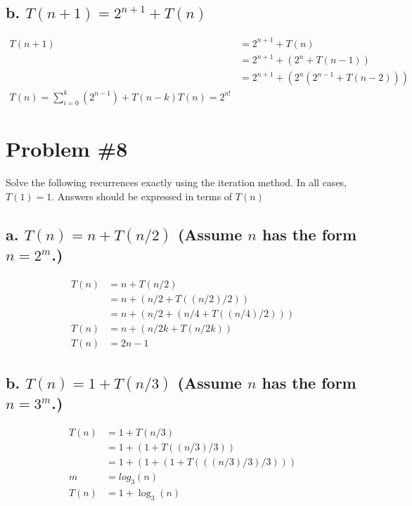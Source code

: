 \documentclass{article}
\begin{document}
\subsection*{b. \(T(n + 1) = 2^{n + 1} + T(n)\)}
\begin{subequations}
  \begin{align}
    T(n + 1) &= 2^{n + 1} + T(n) \\
    &= 2^{n + 1} + (2^{n} + T(n - 1)) \\
    &= 2^{n + 1} + (2^{n} (2^{n - 1} + T(n - 2))) \\
    T(n) = \sum_{i=0}^{k}(2^{n - 1}) + T(n - k)
    T(n) = 2^{n!}
  \end{align}
\end{subequations}

\section*{Problem \#8}
Solve the following recurrences exactly using the iteration method. In all cases, \(T(1) = 1\).
Answers should be expressed in terms of \(T(n)\)

\subsection*{a. \(T(n) = n + T(n/2)\) (Assume \(n\) has the form \(n = 2^m\).)}
\begin{subequations}
  \begin{align}
    T(n) &= n + T(n/2) \\
    &= n + (n/2 + T((n/2)/2)) \\
    &= n + (n/2 + (n/4 + T((n/4)/2))) \\
    T(n) &= n + (n/2k + T(n/2k)) \\
    T(n) &= 2n - 1
  \end{align}
\end{subequations}

\subsection*{b. \(T(n) = 1 + T(n/3)\) (Assume \(n\) has the form \(n = 3^m\).)}
\begin{subequations}
  \begin{align}
    T(n) &= 1 + T(n/3) \\
    &= 1 + (1 + T((n/3)/3)) \\
    &= 1 + (1 + (1 + T(((n/3)/3)/3))) \\
    m &= log_3(n) \\
    T(n) &= 1 + \log_{3}(n)
  \end{align}
\end{subequations}
\end{document}
